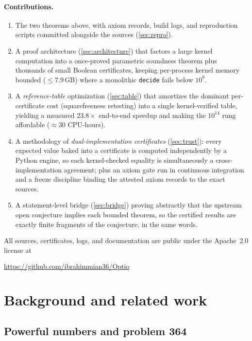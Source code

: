 \documentclass[11pt]{article}
\theoremstyle{definition}
\theoremstyle{remark}
\newcommand{\code}[1]{\texttt{#1}}
\begin{document}
\paragraph{Contributions.}
\begin{enumerate}[leftmargin=2em]
\item The two theorems above, with axiom records, build logs, and
  reproduction scripts committed alongside the sources
  (\cref{sec:repro}).
\item A proof architecture (\cref{sec:architecture}) that factors a
  large kernel computation into a once-proved parametric soundness
  theorem plus thousands of small Boolean certificates, keeping
  per-process kernel memory bounded ($\le 7.9$\,GB) where a monolithic
  \code{decide} fails below $10^9$.
\item A \emph{reference-table} optimization (\cref{sec:table}) that
  amortizes the dominant per-certificate cost (squarefreeness retesting)
  into a single kernel-verified table, yielding a measured $23.8\times$
  end-to-end speedup and making the $10^{14}$ rung affordable
  ($\approx 30$ CPU-hours).
\item A methodology of \emph{dual-implementation certificates}
  (\cref{sec:trust}): every expected value baked into a certificate is
  computed independently by a Python engine, so each kernel-checked
  equality is simultaneously a cross-implementation agreement; plus an
  axiom gate run in continuous integration and a freeze discipline
  binding the attested axiom records to the exact sources.
\item A statement-level bridge (\cref{sec:bridge}) proving abstractly
  that the upstream open conjecture implies each bounded theorem, so the
  certified results are exactly finite fragments of the conjecture, in
  the same words.
\end{enumerate}

All sources, certificates, logs, and documentation are public under the
Apache~2.0 license at
\begin{center}\url{https://github.com/ibrahimmian36/Optio}\end{center}

\section{Background and related work}\label{sec:related}

\subsection{Powerful numbers and problem 364}
\end{document}
